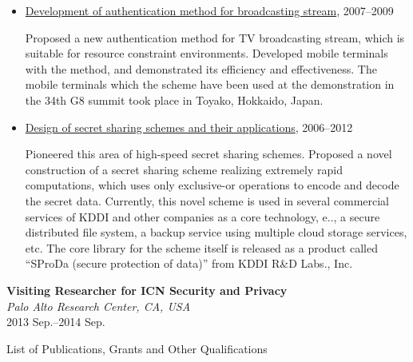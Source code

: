 \begin{itemize}
  \item \hspace*{4ex}
    \underline{Development of authentication method for broadcasting stream},
    2007--2009\\[0.5ex]
    \hspace*{6ex}
    \begin{minipage}{0.9\linewidth}
      Proposed a new authentication method for TV broadcasting stream, which is suitable for
      resource constraint environments. Developed mobile terminals with the
      method, and demonstrated its efficiency and effectiveness.
      The mobile terminals which the scheme have been used at the
      demonstration in the 34th G8 summit took place in Toyako, Hokkaido, Japan.
    \end{minipage}

  \item \hspace*{4ex}
    \underline{Design of secret sharing schemes and their applications},
    2006--2012\\[0.5ex]
    \hspace*{6ex}
    \begin{minipage}{0.9\linewidth}
      Pioneered this area of high-speed secret sharing schemes. Proposed a
      novel construction of a secret sharing scheme realizing extremely rapid
      computations, which uses only exclusive-or operations to encode and
      decode the secret data.
      Currently, this novel scheme is used in several commercial services of
      KDDI and other companies as a core technology,
      e.\@g.\@, a secure distributed file system, a backup
      service using multiple cloud storage services, etc.
      The core library for the scheme itself is released as a product called ``SProDa (secure protection of data)'' from KDDI R\&D Labs., Inc.
    \end{minipage}
\end{itemize}

\textbf{Visiting Researcher for ICN Security and Privacy}\\
\hspace*{4ex}\textit{Palo Alto Research Center, CA, USA}\\
\hspace*{4ex} 2013 Sep.--2014 Sep.

\newpage
\begin{center}
  \Large
  List of Publications, Grants and Other Qualifications
\end{center}

